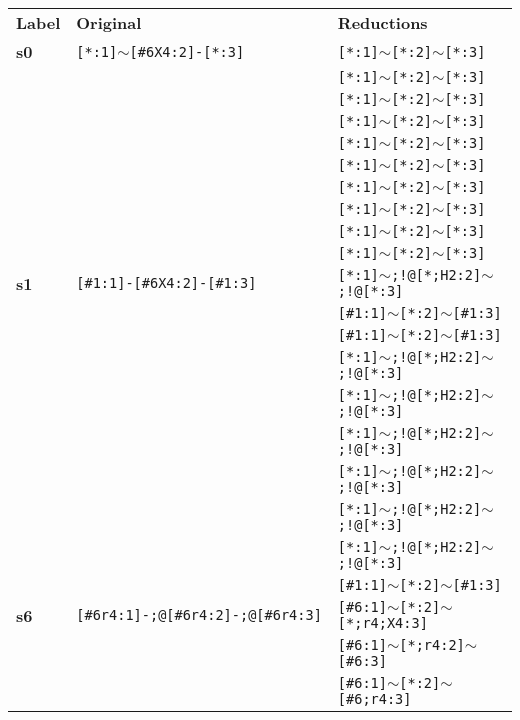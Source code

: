 \renewcommand{\arraystretch}{1.2}
\begin{longtable}{>{\baselineskip=10pt}p{} >{\baselineskip=10pt}p{} >{\baselineskip=10pt}p{}} 
\multicolumn{3}{c}{Angle parameters in AlkEthOH} \\ 
\hline 
\textbf{Label} & \textbf{Original} & \textbf{Reductions} \\ 
\hline 
\endhead\textbf{s0} & \texttt{[*:1]$\sim$[\#6X4:2]-[*:3]} & \texttt{[*:1]$\sim$[*:2]$\sim$[*:3]} \\ 
 &  & \texttt{[*:1]$\sim$[*:2]$\sim$[*:3]} \\ 
 &  & \texttt{[*:1]$\sim$[*:2]$\sim$[*:3]} \\ 
 &  & \texttt{[*:1]$\sim$[*:2]$\sim$[*:3]} \\ 
 &  & \texttt{[*:1]$\sim$[*:2]$\sim$[*:3]} \\ 
 &  & \texttt{[*:1]$\sim$[*:2]$\sim$[*:3]} \\ 
 &  & \texttt{[*:1]$\sim$[*:2]$\sim$[*:3]} \\ 
 &  & \texttt{[*:1]$\sim$[*:2]$\sim$[*:3]} \\ 
 &  & \texttt{[*:1]$\sim$[*:2]$\sim$[*:3]} \\ 
 &  & \texttt{[*:1]$\sim$[*:2]$\sim$[*:3]} \\ 
\hline 
\textbf{s1} & \texttt{[\#1:1]-[\#6X4:2]-[\#1:3]} & \texttt{[*:1]$\sim$;!@[*;H2:2]$\sim$;!@[*:3]} \\ 
 &  & \texttt{[\#1:1]$\sim$[*:2]$\sim$[\#1:3]} \\ 
 &  & \texttt{[\#1:1]$\sim$[*:2]$\sim$[\#1:3]} \\ 
 &  & \texttt{[*:1]$\sim$;!@[*;H2:2]$\sim$;!@[*:3]} \\ 
 &  & \texttt{[*:1]$\sim$;!@[*;H2:2]$\sim$;!@[*:3]} \\ 
 &  & \texttt{[*:1]$\sim$;!@[*;H2:2]$\sim$;!@[*:3]} \\ 
 &  & \texttt{[*:1]$\sim$;!@[*;H2:2]$\sim$;!@[*:3]} \\ 
 &  & \texttt{[*:1]$\sim$;!@[*;H2:2]$\sim$;!@[*:3]} \\ 
 &  & \texttt{[*:1]$\sim$;!@[*;H2:2]$\sim$;!@[*:3]} \\ 
 &  & \texttt{[\#1:1]$\sim$[*:2]$\sim$[\#1:3]} \\ 
\hline 
\textbf{s6} & \texttt{[\#6r4:1]-;@[\#6r4:2]-;@[\#6r4:3]} & \texttt{[\#6:1]$\sim$[*:2]$\sim$[*;r4;X4:3]} \\ 
 &  & \texttt{[\#6:1]$\sim$[*;r4:2]$\sim$[\#6:3]} \\ 
 &  & \texttt{[\#6:1]$\sim$[*:2]$\sim$[\#6;r4:3]} \\ 

\end{longtable}
